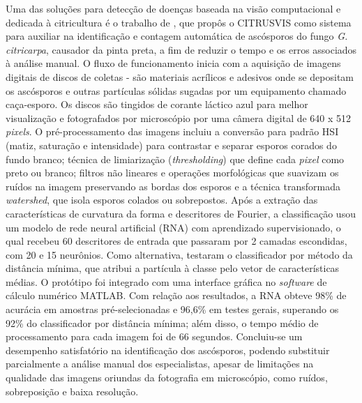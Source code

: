 Uma das soluções para detecção de doenças baseada na visão computacional e dedicada à citricultura é o trabalho de \cite{Pazoti2005}, que propôs o CITRUSVIS como sistema para auxiliar na identificação e contagem automática de ascósporos do fungo \emph{G. citricarpa}, causador da pinta preta, a fim de reduzir o tempo e os erros associados à análise manual. O fluxo de funcionamento inicia com a aquisição de imagens digitais de discos de coletas - são materiais acrílicos e adesivos onde se depositam os ascósporos e outras partículas sólidas sugadas por um equipamento chamado caça-esporo. Os discos são tingidos de corante láctico azul para melhor visualização e fotografados por microscópio por uma câmera digital de 640 x 512 \emph{pixels}. O pré-processamento das imagens incluiu a conversão para padrão HSI (matiz, saturação e intensidade) para contrastar e separar esporos corados do fundo branco; técnica de limiarização (\emph{thresholding}) que define cada \emph{pixel} como preto ou branco; filtros não lineares e operações morfológicas que suavizam os ruídos na imagem preservando as bordas dos esporos e a técnica transformada \emph{watershed}, que isola esporos colados ou sobrepostos. Após a extração das características de curvatura da forma e descritores de Fourier, a classificação usou um modelo de rede neural artificial (RNA) com aprendizado supervisionado, o qual recebeu 60 descritores de entrada que passaram por 2 camadas escondidas, com 20 e 15 neurônios. Como alternativa, testaram o classificador por método da distância mínima, que atribui a partícula à classe pelo vetor de características médias.
O protótipo foi integrado com uma interface gráfica no \emph{software} de cálculo numérico MATLAB. Com relação aos resultados, a RNA obteve 98\% de acurácia em amostras pré-selecionadas e 96,6\% em testes gerais, superando os 92\% do classificador por distância mínima; além disso, o tempo médio de processamento para cada imagem foi de 66 segundos. Concluiu-se um desempenho satisfatório na identificação dos ascósporos, podendo substituir parcialmente a análise manual dos especialistas, apesar de limitações na qualidade das imagens oriundas da fotografia em microscópio, como ruídos, sobreposição e baixa resolução.

